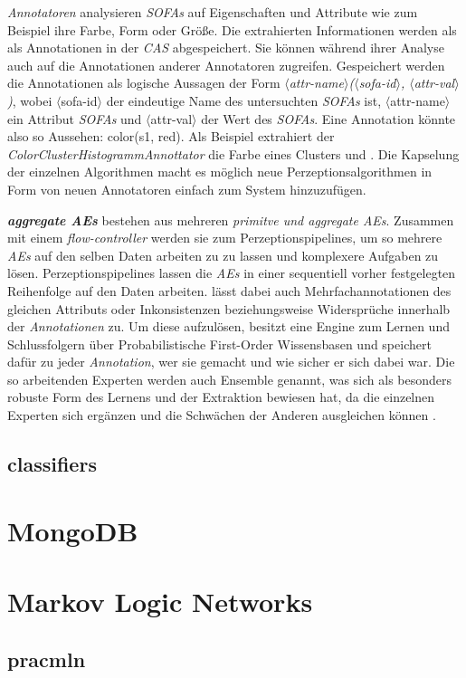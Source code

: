 \textit{Annotatoren} analysieren \textit{SOFAs} auf Eigenschaften und Attribute wie zum Beispiel ihre Farbe, Form oder Größe. Die extrahierten Informationen werden als als Annotationen in der \textit{CAS} abgespeichert. Sie können während ihrer Analyse auch auf die Annotationen anderer Annotatoren zugreifen. Gespeichert werden die Annotationen als logische Aussagen der Form \textit{$\langle$attr-name$\rangle$($\langle$sofa-id$\rangle$, $\langle$attr-val$\rangle$)}, wobei $\langle$sofa-id$\rangle$ der eindeutige Name des untersuchten \textit{SOFAs} ist, $\langle$attr-name$\rangle$ ein Attribut \textit{SOFAs} und $\langle$attr-val$\rangle$ der Wert des \textit{SOFAs}. Eine Annotation könnte also so Aussehen: color(s1, red). Als Beispiel extrahiert der \textit{ColorClusterHistogrammAnnottator} die Farbe eines Clusters und . Die Kapselung der einzelnen Algorithmen macht es möglich neue Perzeptionsalgorithmen in Form von neuen Annotatoren einfach zum System hinzuzufügen. \par
\textbf{\textit{aggregate AEs}} bestehen aus mehreren \textit{primitve und aggregate AEs}. Zusammen mit einem \textit{flow-controller} werden sie zum Perzeptionspipelines, um so mehrere \textit{AEs} auf den selben Daten arbeiten zu zu lassen und komplexere Aufgaben zu lösen. Perzeptionspipelines lassen die \textit{AEs} in einer sequentiell vorher festgelegten Reihenfolge auf den Daten arbeiten. \robosherlock lässt dabei auch Mehrfachannotationen des gleichen Attributs oder Inkonsistenzen beziehungsweise Widersprüche innerhalb der \textit{Annotationen} zu. Um diese aufzulösen, besitzt \robosherlock eine Engine zum Lernen und Schlussfolgern über Probabilistische First-Order Wissensbasen und speichert dafür zu jeder \textit{Annotation}, wer sie gemacht und wie sicher er sich dabei war. Die so arbeitenden Experten werden auch Ensemble genannt, was sich als besonders robuste Form des Lernens und der Extraktion bewiesen hat, da die einzelnen Experten sich ergänzen und die Schwächen der Anderen ausgleichen können  \cite{ensembleEx}.  
  
\subsection{classifiers}
\label{sec:classifiers}


\section{MongoDB}
\label{sec:mongodb}


\section{Markov Logic Networks}
\label{sec:mln}

\subsection{pracmln}
\label{subsec:pracmln}
